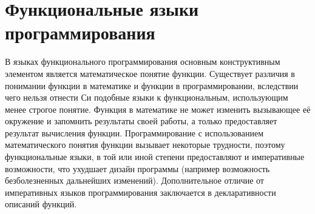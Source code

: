 \documentclass[a4paper]{article}
\begin{document}
\section{Функциональные языки программирования}
В языках функционального программирования основным конструктивным
элементом является математическое понятие функции. Существует различия
в понимании функции в математике и функции в программировании,
вследствии чего нельзя отнести Си подобные языки к функциональным,
использующим менее строгое понятие. Функция в математике не может
изменить вызывающее её окружение и запомнить результаты своей работы,
а только предоставляет результат вычисления функции. Программирование
с использованием математического понятия функции вызывает некоторые
трудности, поэтому функциональные языки, в той или иной степени
предоставляют и императивные возможности, что ухудшает дизайн
программы (например возможность безболезненных дальнейших изменений).
Дополнительное отличие от императивных языков программирования
заключается в декларативности описаний функций.
\end{document}
